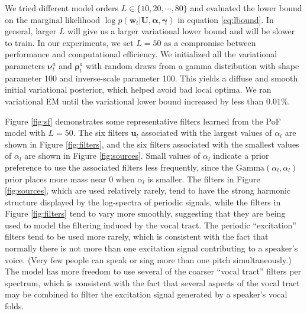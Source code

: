 \documentclass{article} %
\begin{document}
We tried different model orders $L \in \{10, 20, \cdots, 80\}$ and
evaluated the lower bound on the marginal likelihood $\log p(\bm{w}_t
| \mathbf{U}, \bm{\alpha}, \bm{\gamma})$ in equation
\ref{eq:lbound}. In general, larger $L$ will give us a larger
variational lower bound and will be slower to train. 
In our experiments, we set $L = 50$ as a compromise between performance 
and computational efficiency. 
We initialized all the variational parameters $\bm{\nu}_t^a$ and $\bm{\rho}_t^a$ with random draws from a gamma distribution with shape parameter 100 and inverse-scale parameter 100. This yields a diffuse and smooth initial variational posterior, which helped avoid bad local optima.
We ran variational EM until the variational lower bound increased by less than 0.01\%. 

Figure \ref{fig:sf} demonstrates some representative filters learned from the PoF model with $L = 50$.
The six filters $\bm{u}_l$ associated with the largest values of
$\alpha_l$ are shown in Figure \ref{fig:filters}, and the six filters
associated with the smallest values of $\alpha_l$ are shown in Figure
\ref{fig:sources}. Small values of $\alpha_l$ indicate a prior
preference to use the associated filters less frequently, since the
$\mathrm{Gamma}(\alpha_l,\alpha_l)$ prior places more mass near 0 when
$\alpha_l$ is smaller. The filters in Figure \ref{fig:sources}, which
are used relatively rarely, tend to have the strong harmonic structure
displayed by the log-spectra of periodic signals, while the filters in
Figure \ref{fig:filters} tend to vary more smoothly, suggesting that
they are being used to model the filtering induced by the vocal tract.
The periodic ``excitation'' filters tend to be used more rarely, which is consistent with the fact that normally there is not more than one excitation signal contributing to a speaker's voice. (Very few people can speak or sing more than one pitch simultaneously.) The model has more freedom to use several of the coarser ``vocal tract'' filters per spectrum, which is consistent with the fact that several aspects of the vocal tract may be combined to filter the excitation signal generated by a speaker's vocal folds.
\end{document}
